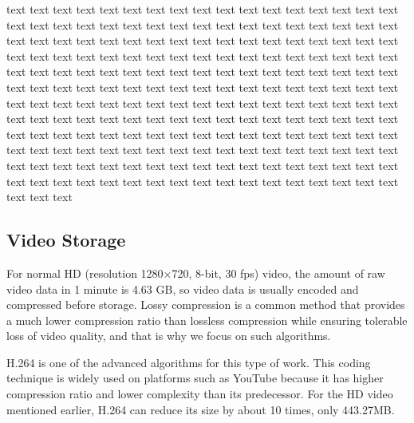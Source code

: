 \documentclass[sigconf]{acmart}
\begin{document}
{text text text text text text text text text text text text text text text text text text text text text text text text text text text text text text text text text text text text text text text text text text text text text text text text text text text text text text text text text text text text text text text text text text text text text text text text text text text text text text text text text text text text text text text text text text text text text text text text text text text text text text text text text text text text text text text text text text text text text text text text text text text text text text text text text text text text text text text text text text text text text text text text text text text text text text text text text text text text text text text text text text text text text text text text text text text text text text text text text text text text text text text text text text text text text text text text text text text text text text text text text text text text text text text }

\subsection{Video Storage}\label{video storage}
For normal HD (resolution 1280$\times$720, 8-bit, 30 fps) video, the amount of raw video data in 1 minute is 4.63 GB, so video data is usually encoded and compressed before storage. Lossy compression is a common method that provides a much lower compression ratio than lossless compression while ensuring tolerable loss of video quality, and that is why we focus on such algorithms.


H.264 is one of the advanced algorithms for this type of work. This coding technique is widely used on platforms such as YouTube because it has higher compression ratio and lower complexity than its predecessor. For the HD video mentioned earlier, H.264 can reduce its size by about 10 times, only 443.27MB.
\end{document}
